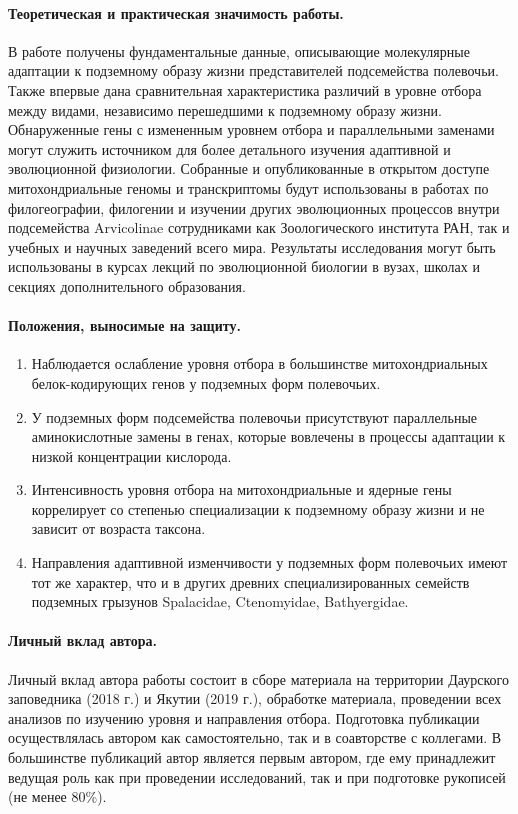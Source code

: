 \paragraph{Теоретическая и практическая значимость работы.} В работе получены фундаментальные данные, описывающие молекулярные адаптации к подземному образу жизни представителей подсемейства полевочьи. Также впервые дана сравнительная характеристика различий в уровне отбора между видами, независимо перешедшими к  подземному образу жизни. Обнаруженные гены с измененным уровнем отбора и параллельными заменами могут служить источником для более детального изучения адаптивной и эволюционной физиологии. Собранные и опубликованные в открытом доступе митохондриальные геномы и транскриптомы будут использованы в работах по филогеографии, филогении и изучении других эволюционных процессов внутри подсемейства Arvicolinae сотрудниками как Зоологического института РАН, так и учебных и научных заведений всего мира. Результаты исследования могут быть использованы в курсах лекций по эволюционной биологии в вузах, школах и секциях дополнительного образования.

\paragraph{Положения, выносимые на защиту.}
\begin{enumerate}
	\item Наблюдается ослабление уровня отбора в большинстве митохондриальных белок-кодирующих генов у подземных форм полевочьих. 
	\item У подземных форм подсемейства полевочьи присутствуют параллельные аминокислотные замены в генах, которые вовлечены в процессы адаптации к низкой концентрации кислорода.
	\item Интенсивность уровня отбора на митохондриальные и ядерные гены коррелирует со степенью специализации к подземному образу жизни и не зависит от возраста таксона.
	\item Направления адаптивной изменчивости у подземных форм полевочьих имеют тот же характер, что и в других древних специализированных семейств подземных грызунов Spalacidae, Ctenomyidae, Bathyergidae.

\end{enumerate}

\paragraph{Личный вклад автора.} Личный вклад автора работы состоит в сборе материала на территории Даурского заповедника (2018 г.) и Якутии (2019 г.), обработке материала, проведении всех анализов по изучению уровня и направления отбора. Подготовка публикации осуществлялась автором как самостоятельно, так и в соавторстве с коллегами. В большинстве публикаций автор является первым автором, где ему принадлежит ведущая роль как при проведении исследований, так и при подготовке рукописей (не менее 80\%).

